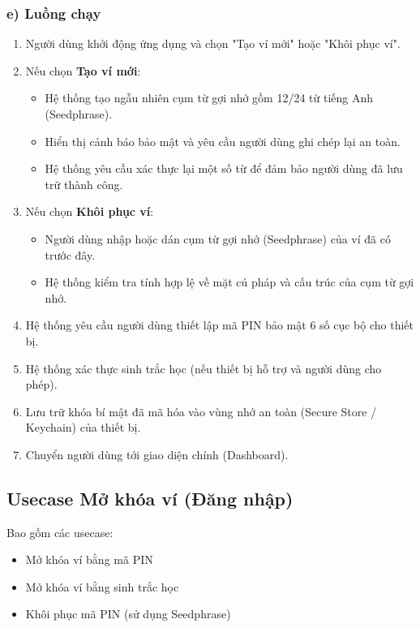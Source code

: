 \documentclass[a4paper]{report}
\begin{document}
\subsubsection{e) Luồng chạy}
\begin{enumerate}
    \item Người dùng khởi động ứng dụng và chọn "Tạo ví mới" hoặc "Khôi phục ví".
    \item Nếu chọn \textbf{Tạo ví mới}:
    \begin{itemize}
        \item Hệ thống tạo ngẫu nhiên cụm từ gợi nhớ gồm 12/24 từ tiếng Anh (Seedphrase).
        \item Hiển thị cảnh báo bảo mật và yêu cầu người dùng ghi chép lại an toàn.
        \item Hệ thống yêu cầu xác thực lại một số từ để đảm bảo người dùng đã lưu trữ thành công.
    \end{itemize}
    \item Nếu chọn \textbf{Khôi phục ví}:
    \begin{itemize}
        \item Người dùng nhập hoặc dán cụm từ gợi nhớ (Seedphrase) của ví đã có trước đây.
        \item Hệ thống kiểm tra tính hợp lệ về mặt cú pháp và cấu trúc của cụm từ gợi nhớ.
    \end{itemize}
    \item Hệ thống yêu cầu người dùng thiết lập mã PIN bảo mật 6 số cục bộ cho thiết bị.
    \item Hệ thống xác thực sinh trắc học (nếu thiết bị hỗ trợ và người dùng cho phép).
    \item Lưu trữ khóa bí mật đã mã hóa vào vùng nhớ an toàn (Secure Store / Keychain) của thiết bị.
    \item Chuyển người dùng tới giao diện chính (Dashboard).
\end{enumerate}

\subsection{Usecase Mở khóa ví (Đăng nhập)}
Bao gồm các usecase:
\begin{itemize}
    \item Mở khóa ví bằng mã PIN
    \item Mở khóa ví bằng sinh trắc học
    \item Khôi phục mã PIN (sử dụng Seedphrase)
\end{itemize}
\end{document}
